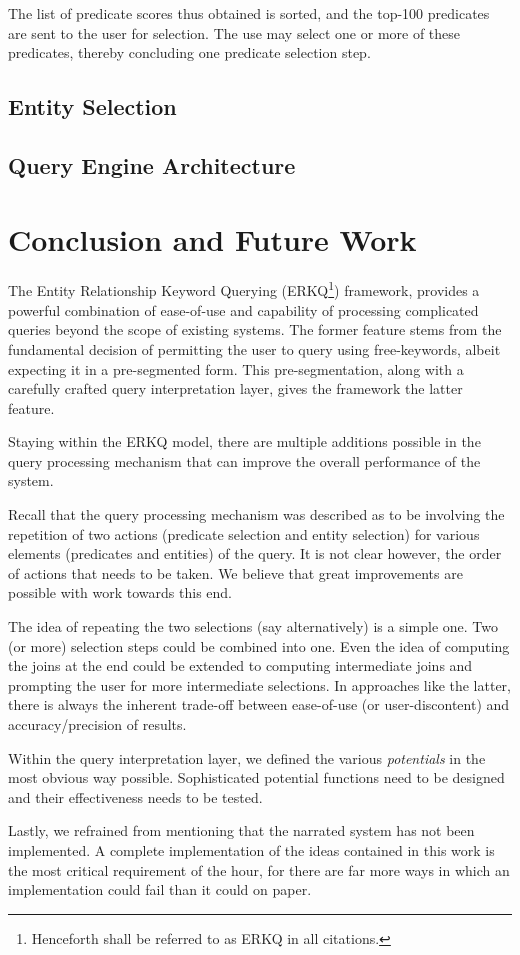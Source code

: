 \documentclass[a4paper, twoside, 12pt]{report}
\begin{document}
The list of predicate scores thus obtained is sorted, and the top-100 predicates are sent to the user for selection. The use may select one or more of these predicates, thereby concluding one predicate selection step.

\section{Entity Selection}

\section{Query Engine Architecture}


\chapter{Conclusion and Future Work}

The Entity Relationship Keyword Querying (ERKQ\footnote{Henceforth shall be referred to as ERKQ in all citations.}) framework, provides a powerful combination of ease-of-use and capability of processing complicated queries beyond the scope of existing systems. The former feature stems from the fundamental decision of permitting the user to query using free-keywords, albeit expecting it in a pre-segmented form. This pre-segmentation, along with a carefully crafted query interpretation layer, gives the framework the latter feature.

Staying within the ERKQ model, there are multiple additions possible in the query processing mechanism that can improve the overall performance of the system.

Recall that the query processing mechanism was described as to be involving the repetition of two actions (predicate selection and entity selection) for various elements (predicates and entities) of the query. It is not clear however, the order of actions that needs to be taken. We believe that great improvements are possible with work towards this end.

The idea of repeating the two selections (say alternatively) is a simple one. Two (or more) selection steps could be combined into one. Even the idea of computing the joins at the end could be extended to computing intermediate joins and prompting the user for more intermediate selections. In approaches like the latter, there is always the inherent trade-off between ease-of-use (or user-discontent) and accuracy/precision of results.

Within the query interpretation layer, we defined the various \emph{potentials} in the most obvious way possible. Sophisticated potential functions need to be designed and their effectiveness needs to be tested.

Lastly, we refrained from mentioning that the narrated system has not been implemented. A complete implementation of the ideas contained in this work is the most critical requirement of the hour, for there are far more ways in which an implementation could fail than it could on paper.



\end{document}
